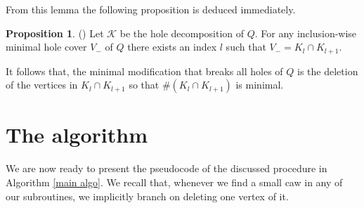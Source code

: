 \documentclass{article}
\theoremstyle{definition}
\newtheorem{prop}[thm]{Proposition}
\begin{document}
    From this lemma the following proposition 
    is deduced immediately.

    \begin{prop} (\cite{main}) \label{cycle prop}
        Let $\mathcal{K}$ be the hole decomposition of
        $Q$. For any
        inclusion-wise 
        minimal hole cover $V_{-}$ of $Q$
        there exists an index $l$ 
        such that $V_{-} = K_{l} \cap K_{l+1}$.
    \end{prop}

    It follows that,
    the minimal modification
    that breaks all holes of $Q$ 
    is the deletion of the
    vertices in $K_{l} \cap K_{l+1}$ 
    so that $\# \left(K_{l} \cap K_{l+1}\right)$
    is minimal.

    \section{The algorithm}
    
    We are now ready to
    present the pseudocode
    of the discussed procedure in
    Algorithm \ref{main algo}.
    We recall that, whenever
    we find a small caw in
    any of our subroutines,
    we implicitly branch
    on deleting one vertex of it.
\end{document}
